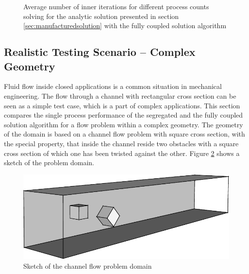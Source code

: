 \begin{figure}[h!]
  \begin{center}
  \end{center}
  \caption{Average number of inner iterations for different process counts solving for the analytic solution presented in section \ref{sec:manufacturedsolution} with the fully coupled solution algorithm}
  \label{fig:weakinner}
\end{figure}

\subsection{Realistic Testing Scenario -- Complex Geometry}
\label{sec:channel}

Fluid flow inside closed applications is a common situation in mechanical engineering. The flow through a channel with rectangular cross section can be seen as a simple test case, which is a part of complex applications. This section compares the single process performance of the segregated and the fully coupled solution algorithm for a flow problem within a complex geometry. The geometry of the domain is based on a channel flow problem with square cross section, with the special property, that inside the channel reside two obstacles with a square cross section of which one has been twisted against the other. Figure \ref{fig:sketch} shows a sketch of the problem domain. 

\begin{figure}
  \centering
  \includegraphics{./img/channel3d.pdf}
  \caption{Sketch of the channel flow problem domain}
  \label{fig:sketch}
\end{figure}

